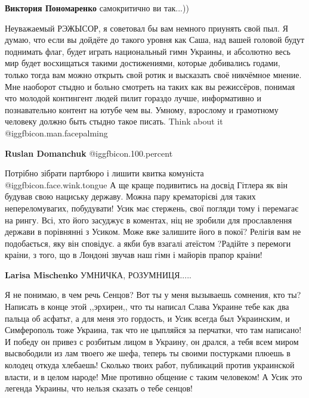 \begin{itemize}
\begin{itemize}
\textbf{Виктория Пономаренко} самокритично ви так...))
\end{itemize} %


Неуважаемый РЭЖЫСОР, я советовал бы вам немного приунять свой пыл. Я думаю, что
если вы дойдёте до такого уровня как Саша, над вашей головой будут поднимать
флаг, будет играть национальный гимн Украины, и абсолютно весь мир будет
восхищаться такими достижениями, которые добивались годами, только тогда вам
можно открыть свой ротик и высказать своё никчёмное мнение. Мне наоборот стыдно
и больно смотреть на таких как вы режиссёров, понимая что молодой контингент
людей пилит гораздо лучше, информативно и познавательно контент на ютубе чем
вы. Умному, взрослому и грамотному человеку должно быть стыдно такое писать.
Think about it @igg{fbicon.man.facepalming} 

\begin{itemize} %
\textbf{Ruslan Domanchuk}  @igg{fbicon.100.percent} 
\end{itemize} %


Потрібно зібрати партбюро і лишити квитка комуніста @igg{fbicon.face.wink.tongue} А ще краще подивитись на
досвід Гітлера як він будував свою нациську державу. Можна пару крематорієві для
таких непереломувагих, побудувати! Усик має стержень, свої погляди тому і
перемагає на рингу. Всі, хто його засуджує в коментах, ніц не зробили для
прославлення держави в порівнянні з Усиком. Може вже залишите його в
покої? Релігія вам не подобається, яку він сповідує. а якби був взагалі атеїстом
?Радійте з перемоги краіни, з того, що в Лондоні звучав наш гімн і майорів прапор
краіни!

\begin{itemize} %
\textbf{Larisa Mischenko} УМНИЧКА, РОЗУМНИЦЯ.....
\end{itemize} %


Я не понимаю, в чем речь Сенцов? Вот ты у меня вызываешь сомнения, кто ты?
Написать в конце этой ,,эрхиреи,, что ты написал Слава Украине тебе как два
пальца об асфатьт, а для меня это гордость, и Усик всегда был Украинским, и
Симферополь тоже Украина, так что не цыпляйся за перчатки, что там написано! И
победу он привез с розбитым лицом в Украину, он дрался, а тебя всем миром
высвободили из лам твоего же шефа, теперь ты своими постурками плюешь в колодец
откуда хлебаешь! Сколько твоих работ, публикаций против украинской власти, и в
целом народе! Мне противно общение с таким человеком! А Усик это легенда
Украины, что нельзя сказать о тебе сенцов!


\end{itemize}
